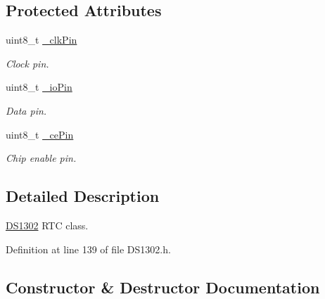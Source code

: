 \subsection*{Protected Attributes}
\begin{DoxyCompactItemize}
\item 
uint8\+\_\+t \hyperlink{class_d_s1302_aa6c120424fba3bad0526c12e1dd87ef8}{\+\_\+clk\+Pin}\hypertarget{class_d_s1302_aa6c120424fba3bad0526c12e1dd87ef8}{}\label{class_d_s1302_aa6c120424fba3bad0526c12e1dd87ef8}

\begin{DoxyCompactList}\small\item\em Clock pin. \end{DoxyCompactList}\item 
uint8\+\_\+t \hyperlink{class_d_s1302_afc35e276d666091464d58c48a9191582}{\+\_\+io\+Pin}\hypertarget{class_d_s1302_afc35e276d666091464d58c48a9191582}{}\label{class_d_s1302_afc35e276d666091464d58c48a9191582}

\begin{DoxyCompactList}\small\item\em Data pin. \end{DoxyCompactList}\item 
uint8\+\_\+t \hyperlink{class_d_s1302_ad187c323edcbacb3283c4a91b186695e}{\+\_\+ce\+Pin}\hypertarget{class_d_s1302_ad187c323edcbacb3283c4a91b186695e}{}\label{class_d_s1302_ad187c323edcbacb3283c4a91b186695e}

\begin{DoxyCompactList}\small\item\em Chip enable pin. \end{DoxyCompactList}\end{DoxyCompactItemize}


\subsection{Detailed Description}
\hyperlink{class_d_s1302}{D\+S1302} R\+TC class. 

Definition at line 139 of file D\+S1302.\+h.



\subsection{Constructor \& Destructor Documentation}
